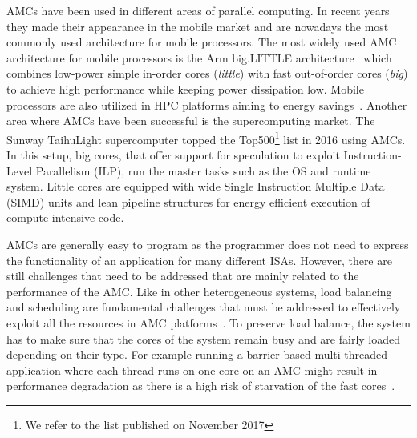 AMCs have been used in different areas of parallel computing. 
In recent years they made their appearance in the mobile market and are nowadays the most commonly used architecture for mobile processors.
The most widely used AMC architecture for mobile processors is the Arm big.LITTLE architecture~\cite{Greenhalgh2011} which combines low-power simple in-order cores (\emph{little}) with fast out-of-order cores (\emph{big}) to achieve high performance while keeping power dissipation low.
Mobile processors are also utilized in HPC platforms aiming to energy savings~\cite{ARMV8}.
Another area where AMCs have been successful is the supercomputing market.
The Sunway TaihuLight supercomputer topped the Top500\footnote{We refer to the list published on November 2017} list in 2016 using AMCs. 
In this setup, big cores, that offer support for speculation to exploit Instruction-Level Parallelism (ILP), run the master tasks such as the OS and runtime system.
Little cores are equipped with wide Single Instruction Multiple Data (SIMD) units and lean pipeline structures for energy efficient execution of compute-intensive code. 

AMCs are generally easy to program as the programmer does not need to express the functionality of an application for many different ISAs. 
However, there are still challenges that need to be addressed that are mainly related to the performance of the AMC.
Like in other heterogeneous systems, load balancing and scheduling are fundamental challenges that must be addressed to effectively exploit all the resources in AMC platforms~\cite{Suleman:APLOS2009,Fedorova2009,Greenhalgh2011,Joao:ASPLOS2012,Joao:ISCA2013,ARM4HPC_SC13}. 
To preserve load balance, the system has to make sure that the cores of the system remain busy and are fairly loaded depending on their type.
For example running a barrier-based multi-threaded application where each thread runs on one core on an AMC might result in performance degradation as there is a high risk of starvation of the fast cores~\cite{AMC_survey}. %

